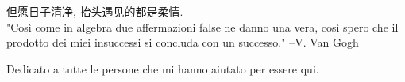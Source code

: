 
\cleardoublepage
{}
\thispagestyle{empty}

\vspace*{3cm}

\begin{center}
    但愿日子清净, 抬头遇见的都是柔情.\\ \medskip
    "Così come in algebra due affermazioni false ne danno una vera, così spero che il prodotto dei miei insuccessi si concluda con un successo." \medskip
    --V. Van Gogh
\end{center}

\medskip

\begin{center}
Dedicato a tutte le persone che mi hanno aiutato per essere qui.
\end{center}
